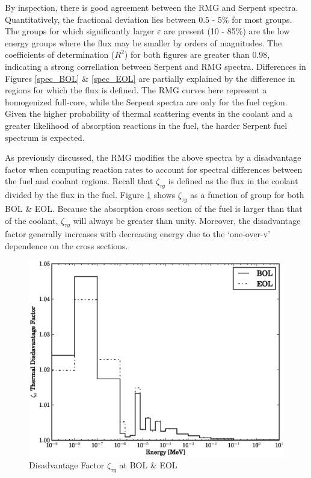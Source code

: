 By inspection, there is good agreement between the RMG and Serpent spectra.  Quantitatively, 
the fractional deviation lies between 0.5 - 5\% for most groups.  The groups for which 
significantly larger $\varepsilon$ are present (10 - 85\%) are  the low energy groups 
where the flux may be smaller by orders of magnitudes.  
The coefficients of determination ($R^2$) for both figures are greater than 0.98, indicating a
strong correllation between Serpent and RMG spectra.  Differences in Figures \ref{spec_BOL} \& 
\ref{spec_EOL} are partially explained by the difference in regions for which the flux is defined.
The RMG curves here represent a homogenized full-core, while the Serpent spectra are only for the 
fuel region.  Given the higher probability of thermal scattering events in the coolant and a greater likelihood of
absorption reactions in the fuel, the harder Serpent fuel spectrum is expected.

As previously discussed, the RMG modifies the above spectra by a disadvantage factor when computing 
reaction rates to account for spectral differences between the fuel and coolant regions.
Recall that $\zeta_{\tau g}$ is defined as the flux in the coolant divided by the flux in the fuel.
Figure \ref{zeta_BOL_EOL} shows $\zeta_{\tau g}$ as a function of group for both BOL \& EOL.
Because the absorption cross section of the fuel is larger than that of the coolant, 
$\zeta_{\tau g}$ will always be greater than unity.  Moreover, the disadvantage factor generally
increases with decreasing energy due to the `one-over-v' dependence on the cross sections. 

\begin{figure}[htbp]
\caption{Disadvantage Factor $\zeta_{\tau g}$ at BOL \& EOL}
\label{zeta_BOL_EOL}
\begin{center}
\includegraphics[scale=0.5]{multigroup_method/figs/benchmark/zeta.eps}
\end{center}
\end{figure}


